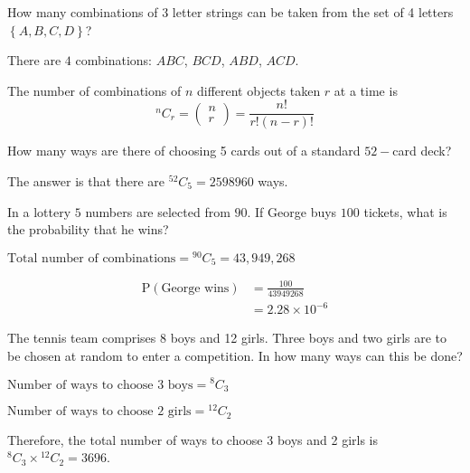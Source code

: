 \documentclass[11pt,a4paper]{book}
\begin{document}
\medskip

How many combinations of 3 letter strings can be taken from the set
of 4 letters $\left\{ A,B,C,D\right\} $?

There are $4$ combinations: $ABC$, $BCD$, $ABD$, $ACD$.

\medskip

\begin{tcolorbox}[colback=blue!5, colframe=black, boxrule=.4pt, sharpish corners]

The number of combinations of $n$ different objects taken $r$ at
a time is
\[
^{n}C_{r}=\begin{pmatrix}n\\
r
\end{pmatrix}=\frac{n!}{r!\left(n-r\right)!}
\]
\end{tcolorbox}

How many ways are there of choosing 5 cards out of a standard $52-$card deck?

The answer is that there are $^{52}C_{5}=2598960$ ways.

\begin{example}

In a lottery $5$ numbers are selected from $90$. If George buys
$100$ tickets, what is the probability that he wins?

\Solution

$\text{Total number of combinations}={}^{90}C_{5}=43,949,268$

\begin{align*}
\text{P}\left(\text{George wins}\right) & =\frac{100}{43949268}\\
 & =2.28\times10^{-6}
\end{align*}

\end{example}

\begin{example}

The tennis team comprises 8 boys and 12 girls. Three boys and two
girls are to be chosen at random to enter a competition. In how many
ways can this be done?


\Solution


$\text{Number of ways to choose 3 boys}={}^{8}C_{3}$

$\text{Number of ways to choose 2 girls}={}^{12}C_{2}$

Therefore, the total number of ways to choose 3 boys and 2 girls is
$^{8}C_{3}\times{}^{12}C_{2}=3696$.


\end{example}
\end{document}
